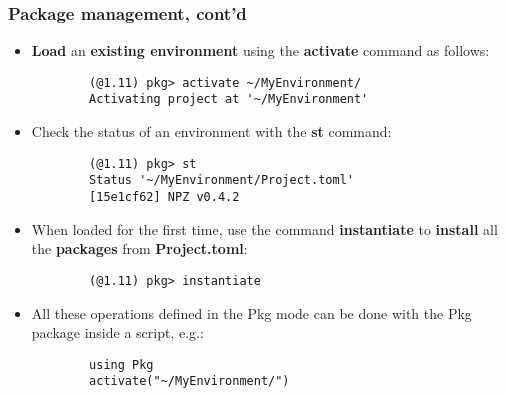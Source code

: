 \documentclass[t,usepdftitle=false]{beamer}
\begin{document}
\begin{frame}[fragile]
	\frametitle{Package management, cont'd}
	\begin{itemize}
	\item \textbf{Load} an \textbf{existing environment} using the \textbf{activate} command as follows:
	\vspace{.1cm}
	\begin{verbatim}
		(@1.11) pkg> activate ~/MyEnvironment/
		Activating project at '~/MyEnvironment'
	\end{verbatim}
	\normalsize			
	\vspace{.1cm}
	\item Check the status of an environment with the \textbf{st} command:
	\vspace{.1cm}
	\begin{verbatim}
		(@1.11) pkg> st
		Status '~/MyEnvironment/Project.toml'
		[15e1cf62] NPZ v0.4.2
	\end{verbatim}
	\normalsize		
	\vspace{.1cm}
	\item When loaded for the first time, use the command \textbf{instantiate} to \textbf{install} all the \textbf{packages} from \textbf{Project.toml}:
	\vspace{.1cm}
	\begin{verbatim}
		(@1.11) pkg> instantiate
	\end{verbatim}
	\normalsize		
	\vspace{.1cm}		
	\item All these operations defined in the Pkg mode can be done with the Pkg package inside a script, e.g.:
	\vspace{.1cm}
	\begin{verbatim}
		using Pkg
		activate("~/MyEnvironment/")
	\end{verbatim}
	\normalsize		
	\end{itemize}
\end{frame}  
\end{document}
